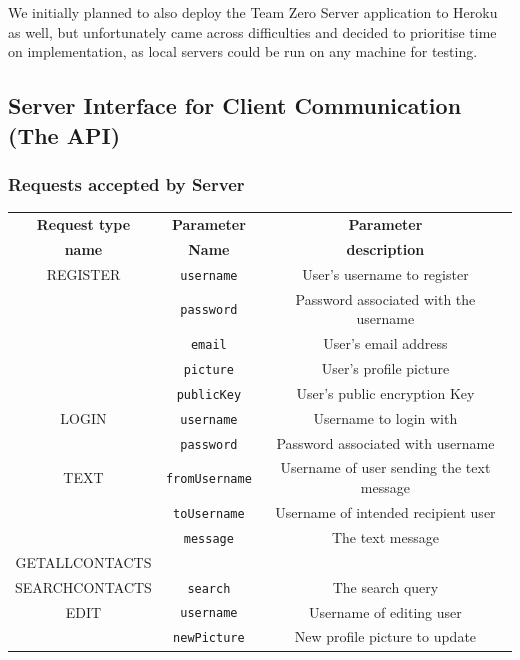 We initially planned to also deploy the Team Zero Server application to Heroku as well, but unfortunately came across difficulties and decided to prioritise time on implementation, as local servers could be run on any machine for testing. 


\subsection{Server Interface for Client Communication (The API)}

\subsubsection{Requests accepted by Server}
\label{requestsToServer}


\begin{table}[H]
        \centering
        \small
        \setlength\tabcolsep{5pt}
\scriptsize
\begin{tabular}{ |c|c|c| } 
 \hline
 \textbf{Request type} & \textbf{Parameter} & \textbf{Parameter} \\
 \textbf{name} & \textbf{Name} & \textbf{description} \\
 \hline
 REGISTER & \verb|username| & User's username to register  \\ 
 & \verb|password| & Password associated with the username
 \\  &\verb|email|& User's email address
 \\  &\verb|picture|& User's profile picture
 \\  &\verb|publicKey|& User's public encryption Key
 \\  
  \hline
  LOGIN & \verb|username| & Username to login with  \\
  &\verb|password|& Password associated with username\\ 
  \hline
 TEXT & \verb|fromUsername| & Username of user sending the text message  \\ 
   & \verb|toUsername| & Username of intended recipient user
  \\  & \verb|message| & The text message \\ 
  \hline
 GETALLCONTACTS &  &   \\ 
  \hline
 SEARCHCONTACTS & \verb|search| & The search query \\ 
  \hline
 EDIT & \verb|username| & Username of editing user  \\ 
 &\verb|newPicture|& New profile picture to update \\

\end{tabular}
\end{table}
